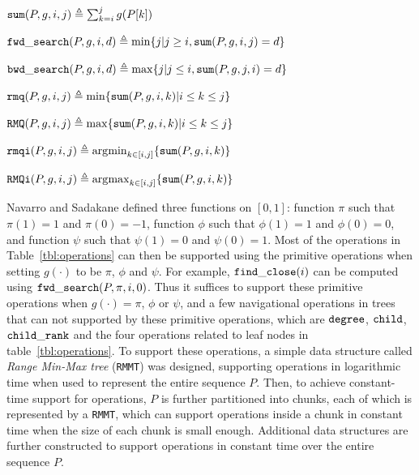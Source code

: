 \begin{myitemize}
\item $\mathtt{sum}(P,g,i,j)\triangleq \sum_{k=i}^jg(P[k])$
\item $\mathtt{fwd\_search}(P,g,i,d)\triangleq \min\{j | j \ge i, \mathtt{sum}(P,g,i,j) = d\}$
\item $\mathtt{bwd\_search}(P,g,i,d)\triangleq \max\{j | j \le i, \mathtt{sum}(P,g,j,i) = d\}$
\item $\mathtt{rmq}(P,g,i,j)\triangleq \min\{\mathtt{sum}(P,g,i,k)| i\le k\le j\}$
\item $\mathtt{RMQ}(P,g,i,j)\triangleq \max\{\mathtt{sum}(P,g,i,k)| i\le k\le j\}$
\item $\mathtt{rmqi}(P,g,i,j)\triangleq \operatorname*{arg\!\min}_{k\in[i,j]}\{\mathtt{sum}(P,g,i,k)\}$
\item $\mathtt{RMQi}(P,g,i,j)\triangleq \operatorname*{arg\!\max}_{k\in[i,j]}\{\mathtt{sum}(P,g,i,k)\}$
\end{myitemize}

Navarro and Sadakane defined three functions on $[0,1]$: function $\pi$ such that $\pi(1) = 1$ and $\pi(0) = -1$, function $\phi$ such that $\phi(1) = 1$ and $\phi(0) = 0$, and function $\psi$ such that $\psi(1) = 0$ and $\psi(0) = 1$. 
Most of the operations in Table~\ref{tbl:operations} can then be supported using the primitive operations when setting $g(\cdot)$ to be $\pi$, $\phi$ and $\psi$. For example, $\mathtt{find\_close}(i)$ can be computed using $\mathtt{fwd\_search}(P,\pi,i,0)$. 
Thus it suffices to support these primitive operations when $g(\cdot) = \pi$, $\phi$ or $\psi$, and a few  navigational operations in trees that can not supported by these primitive operations, which are $\mathtt{degree}$, $\mathtt{child}$, $\mathtt{child\_rank}$ and the four operations related to leaf nodes in table~\ref{tbl:operations}. 
To support these operations, a simple data structure called \emph{Range Min-Max tree} ({\tt RMMT}) was designed, supporting operations in logarithmic time when used to represent the entire sequence $P$. 
Then, to achieve constant-time support for operations, $P$ is further partitioned into chunks, each of which is represented by a {\tt RMMT}, which can support operations inside a chunk in constant time when the size of each chunk is small enough. Additional data structures are further constructed to support operations in constant time over the entire sequence $P$. 

